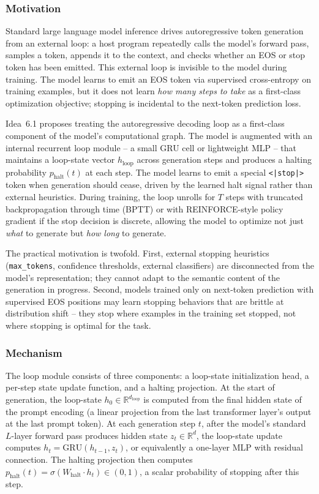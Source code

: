 \documentclass[11pt]{article}
\begin{document}
\subsubsection*{Motivation}

Standard large language model inference drives autoregressive token generation from an external loop: a host program repeatedly calls the model's forward pass, samples a token, appends it to the context, and checks whether an EOS or stop token has been emitted. This external loop is invisible to the model during training. The model learns to emit an EOS token via supervised cross-entropy on training examples, but it does not learn \emph{how many steps to take} as a first-class optimization objective; stopping is incidental to the next-token prediction loss.

Idea~6.1 proposes treating the autoregressive decoding loop as a first-class component of the model's computational graph. The model is augmented with an internal recurrent loop module -- a small GRU cell or lightweight MLP -- that maintains a loop-state vector $h_\text{loop}$ across generation steps and produces a halting probability $p_\text{halt}(t)$ at each step. The model learns to emit a special \texttt{<|stop|>} token when generation should cease, driven by the learned halt signal rather than external heuristics. During training, the loop unrolls for $T$ steps with truncated backpropagation through time (BPTT) or with REINFORCE-style policy gradient if the stop decision is discrete, allowing the model to optimize not just \emph{what} to generate but \emph{how long} to generate.

The practical motivation is twofold. First, external stopping heuristics (\texttt{max\_tokens}, confidence thresholds, external classifiers) are disconnected from the model's representation; they cannot adapt to the semantic content of the generation in progress. Second, models trained only on next-token prediction with supervised EOS positions may learn stopping behaviors that are brittle at distribution shift -- they stop where examples in the training set stopped, not where stopping is optimal for the task.

\subsubsection*{Mechanism}

The loop module consists of three components: a loop-state initialization head, a per-step state update function, and a halting projection. At the start of generation, the loop-state $h_0 \in \mathbb{R}^{d_\text{loop}}$ is computed from the final hidden state of the prompt encoding (a linear projection from the last transformer layer's output at the last prompt token). At each generation step $t$, after the model's standard $L$-layer forward pass produces hidden state $z_t \in \mathbb{R}^d$, the loop-state update computes $h_t = \text{GRU}(h_{t-1}, z_t)$, or equivalently a one-layer MLP with residual connection. The halting projection then computes $p_\text{halt}(t) = \sigma(W_\text{halt} \cdot h_t) \in (0,1)$, a scalar probability of stopping after this step.
\end{document}
